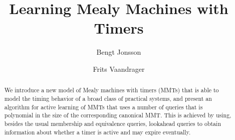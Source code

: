 \documentclass[sigplan,9pt]{acmart}
\newif\ifshort
\begin{document}
\title{Learning Mealy Machines with Timers}
\author{Bengt Jonsson}
\author{Frits Vaandrager}


\ifshort
\vspace{-2em}
\fi
\begin{abstract}
We introduce a new model of Mealy machines with timers (MMTs) that is able to model the timing behavior of a broad class of practical systems, and present an algorithm for active learning of MMTs that uses a
number of queries that is polynomial in the size of the corresponding canonical MMT. This is achieved by using, besides the usual membership and equivalence queries, 
lookahead queries to obtain information about whether a timer is active and may expire eventually.
\end{abstract}

\maketitle





%





\end{document}
